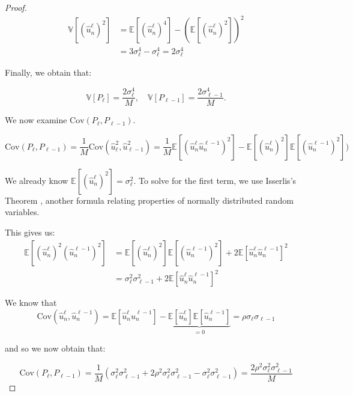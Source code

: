 \begin{proof}
    \begin{align*}
        \mathbb{V}[(\hat{u}_n^\ell)^2] &= 
        \mathbb{E}[(\hat{u}_n^\ell)^4] - 
        \left(\mathbb{E}[(\hat{u}_n^\ell)^2]\right)^2 \\
        &= 3\sigma_\ell^4 - \sigma_\ell^4 = 2\sigma_\ell^4
    \end{align*}

    Finally, we obtain that:

    \begin{equation}\label{eq:P_var_estimates}
        \mathbb{V}[P_\ell] = \frac{2\sigma_\ell^4}{M}, \quad 
        \mathbb{V}[P_{\ell-1}] = \frac{2\sigma_{\ell-1}^4}{M}.
    \end{equation}

    We now examine $\mathrm{Cov}\left(P_\ell, P_{\ell-1}\right)$.

    \begin{equation*}
        \mathrm{Cov}(P_\ell, P_{\ell-1}) = 
        \frac{1}{M}\mathrm{Cov}(\hat{u}_\ell^2, \hat{u}_{\ell-1}^2) 
        = \frac{1}{M}\mathbb{E}[(\hat{u}_n^\ell \hat{u}_n^{\ell-1})^2] 
        - \mathbb{E}[(\hat{u}_n^\ell)^2]\mathbb{E}[(\hat{u}_n^{\ell-1})^2])
    \end{equation*}

    We already know $\mathbb{E}[(\hat{u}_n^\ell)^2] = \sigma_\ell^2$.
    To solve for the first term, we use Isserlis's Theorem 
    \cite{isserlis1918formula}, another 
    formula relating properties of normally distributed random variables.

    This gives us:
    \begin{align*}
        \mathbb{E}\left[(\hat{u}_n^\ell)^2(\hat{u}_n^{\ell-1})^2\right] 
        &= \mathbb{E}[(\hat{u}_n^{\ell})^2]\mathbb{E}[(\hat{u}_n^{\ell-1})^2]
         + 2\mathbb{E}[\hat{u}_n^\ell \hat{u}_n^{\ell-1}]^2 \\
        &= \sigma_\ell^2 \sigma_{\ell-1}^2 + 
        2\mathbb{E}[\hat{u}_n^\ell \hat{u}_n^{\ell-1}]^2
    \end{align*}

    We know that 
    $$
    \mathrm{Cov}(\hat{u}_n^\ell, \hat{u}_n^{\ell-1})
    = \mathbb{E}[\hat{u}_n^\ell \hat{u}_n^{\ell-1}] - 
    \underbrace{\mathbb{E}[\hat{u}_n^\ell]\mathbb{E}[\hat{u}_n^{\ell-1}]}_{=0}
    =\rho \sigma_\ell \sigma_{\ell-1}
    $$

    and so we now obtain that:

    \begin{equation}\label{eq:cov_fourier_var}
        \mathrm{Cov}(P_\ell, P_{\ell-1}) = 
        \frac{1}{M}\left(\sigma_\ell^2 \sigma_{\ell-1}^2 + 
        2\rho^2\sigma_\ell^2 \sigma_{\ell-1}^2 - 
        \sigma_\ell^2 \sigma_{\ell-1}^2\right)
        = \frac{2\rho^2\sigma_\ell^2\sigma_{\ell-1}^2}{M}
    \end{equation}


\end{proof}

